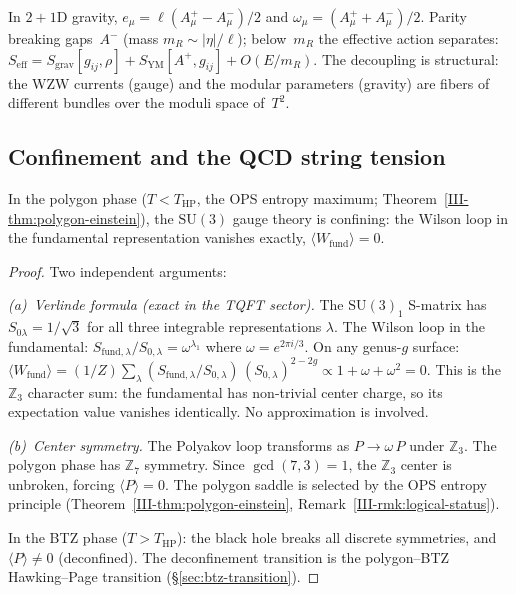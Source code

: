 \begin{remark}
\label{rmk:su2-decoupling}
In $2{+}1$D gravity, $e_\mu = \ell(A^+_\mu - A^-_\mu)/2$
and $\omega_\mu = (A^+_\mu + A^-_\mu)/2$.
Parity breaking gaps~$A^-$ (mass $m_R \sim |\eta|/\ell$);
below~$m_R$ the effective action separates:
$S_{\mathrm{eff}} = S_{\mathrm{grav}}[g_{ij}, \rho]
+ S_{\mathrm{YM}}[A^+, g_{ij}] + O(E/m_R)$.
The decoupling is structural: the WZW currents (gauge)
and the modular parameters (gravity) are fibers of
different bundles over the moduli space of~$T^2$.
\end{remark}

\subsection{Confinement and the QCD string tension}
\label{sec:confinement}

\begin{proposition}[Confinement]
\label{prop:confinement}
In the polygon phase ($T < T_{\mathrm{HP}}$, the OPS entropy
maximum; Theorem~\ref{III-thm:polygon-einstein}), the $\mathrm{SU}(3)$ gauge theory
is confining: the Wilson loop in the fundamental representation
vanishes exactly, $\langle W_{\mathrm{fund}}\rangle = 0$.
\end{proposition}

\begin{proof}
Two independent arguments:

\emph{(a)~Verlinde formula (exact in the TQFT sector).}
The $\mathrm{SU}(3)_1$ S-matrix has
$S_{0\lambda} = 1/\sqrt{3}$ for all three integrable
representations $\lambda$.
The Wilson loop in the fundamental:
$S_{\mathrm{fund},\lambda}/S_{0,\lambda}
= \omega^{\lambda_1}$ where $\omega = e^{2\pi i/3}$.
On any genus-$g$ surface:
$\langle W_{\mathrm{fund}}\rangle
= (1/Z)\sum_\lambda (S_{\mathrm{fund},\lambda}/S_{0,\lambda})
\,(S_{0,\lambda})^{2-2g}
\propto 1 + \omega + \omega^2 = 0$.
This is the $\mathbb{Z}_3$ character sum: the fundamental
has non-trivial center charge, so its expectation value
vanishes identically. No approximation is involved.

\emph{(b)~Center symmetry.}
The Polyakov loop transforms as $P \to \omega\,P$ under
$\mathbb{Z}_3$.
The polygon phase has $\mathbb{Z}_7$ symmetry.
Since $\gcd(7, 3) = 1$, the $\mathbb{Z}_3$ center is
unbroken, forcing $\langle P\rangle = 0$.
The polygon saddle is selected by the OPS entropy
principle (Theorem~\ref{III-thm:polygon-einstein},
Remark~\ref{III-rmk:logical-status}).

In the BTZ phase ($T > T_{\mathrm{HP}}$): the black hole
breaks all discrete symmetries, and
$\langle P\rangle \ne 0$ (deconfined).
The deconfinement transition is the polygon--BTZ
Hawking--Page transition (\S\ref{sec:btz-transition}).
\end{proof}

